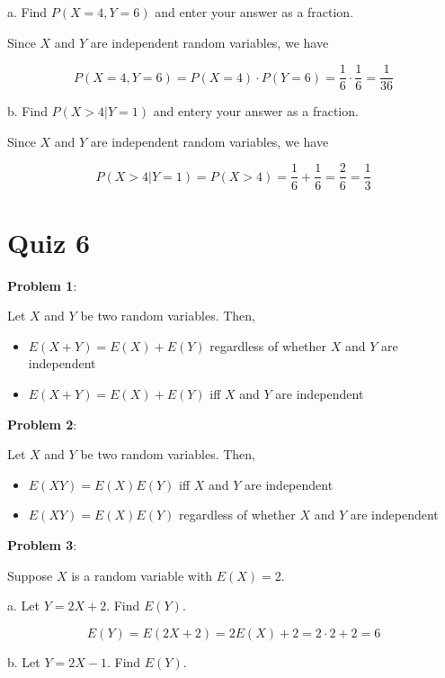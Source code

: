 \documentclass{article}
\begin{document}
\indent\indent a. Find $P(X=4,Y=6)$ and enter your answer as a fraction. 

{\color{blue}

Since $X$ and $Y$ are independent random variables, we have

\[P(X=4, Y=6)=P(X=4)\cdot P(Y=6)=\frac{1}{6}\cdot\frac{1}{6}=\frac{1}{36}\]

}

\indent\indent b. Find $P(X>4|Y=1)$ and entery your answer as a fraction. 

{\color{blue}

Since $X$ and $Y$ are independent random variables, we have

\[P(X>4|Y=1)=P(X>4)=\frac{1}{6}+\frac{1}{6}=\frac{2}{6}=\frac{1}{3}\]

}

\section{Quiz 6}

\noindent\textbf{Problem 1}:

Let $X$ and $Y$ be two random variables. Then,

\begin{itemize}
    \item {\color{blue}$E(X+Y)=E(X)+E(Y)$ regardless of whether $X$ and $Y$ are independent}
    \item $E(X+Y)=E(X)+E(Y)$ iff $X$ and $Y$ are independent
\end{itemize}

\noindent\textbf{Problem 2}:

Let $X$ and $Y$ be two random variables. Then,

\begin{itemize}
    \item {\color{blue}$E(XY)=E(X)E(Y)$  iff $X$ and $Y$ are independent}
    \item $E(XY)=E(X)E(Y)$ regardless of whether $X$ and $Y$ are independent
\end{itemize}

\noindent\textbf{Problem 3}:

Suppose $X$ is a random variable with $E(X)=2$.

\indent\indent a. Let $Y=2X+2$. Find $E(Y)$.

{\color{blue}

\[E(Y)=E(2X+2)=2E(X)+2=2\cdot2+2=6\]

}

\indent\indent b. Let $Y=2X-1$. Find $E(Y)$.
\end{document}
